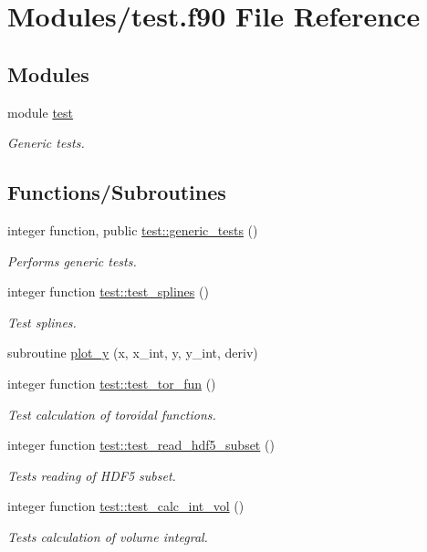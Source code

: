 \hypertarget{test_8f90}{}\section{Modules/test.f90 File Reference}
\label{test_8f90}
\subsection*{Modules}
\begin{DoxyCompactItemize}
\item 
module \hyperlink{namespacetest}{test}
\begin{DoxyCompactList}\small\item\em Generic tests. \end{DoxyCompactList}\end{DoxyCompactItemize}
\subsection*{Functions/\+Subroutines}
\begin{DoxyCompactItemize}
\item 
integer function, public \hyperlink{namespacetest_aca21ee464c0b1f4b617177afdde110ec}{test\+::generic\+\_\+tests} ()
\begin{DoxyCompactList}\small\item\em Performs generic tests. \end{DoxyCompactList}\item 
integer function \hyperlink{namespacetest_a53c6b3d654d4577af301fe3b04473d6a}{test\+::test\+\_\+splines} ()
\begin{DoxyCompactList}\small\item\em Test splines. \end{DoxyCompactList}\item 
subroutine \hyperlink{test_8f90_a197914f99b7e194fb4bca9ca3669e0e8}{plot\+\_\+y} (x, x\+\_\+int, y, y\+\_\+int, deriv)
\item 
integer function \hyperlink{namespacetest_ab595ec935321ea0b1168593fb88fad22}{test\+::test\+\_\+tor\+\_\+fun} ()
\begin{DoxyCompactList}\small\item\em Test calculation of toroidal functions. \end{DoxyCompactList}\item 
integer function \hyperlink{namespacetest_ac574f08ba400cd61070a6a6f13f6f7ee}{test\+::test\+\_\+read\+\_\+hdf5\+\_\+subset} ()
\begin{DoxyCompactList}\small\item\em Tests reading of H\+D\+F5 subset. \end{DoxyCompactList}\item 
integer function \hyperlink{namespacetest_a0d4cb791bf762b2e52260fea7644a3ee}{test\+::test\+\_\+calc\+\_\+int\+\_\+vol} ()
\begin{DoxyCompactList}\small\item\em Tests calculation of volume integral. \end{DoxyCompactList}\end{DoxyCompactItemize}


